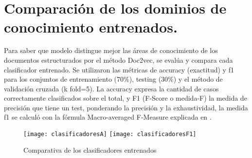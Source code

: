 %
%
%
%


\section{Comparación  de los dominios de conocimiento entrenados.}

Para saber que modelo distingue mejor las áreas de conocimiento de los documentos  estructurados por el método  Doc2vec, se evalúa y compara cada clasificador entrenado.
  Se utilizaron las métricas de accuracy (exactitud) y f1 para los conjuntos de entrenamiento (70\%),   testing (30\%) y el método de validación cruzada (k fold=5). La accuracy expresa la cantidad de casos correctamente clasificados sobre el total, y F1 (F-Score o medida-F) la medida de precisión que tiene un test, ponderando la precisión y la exhaustividad, la medida f1 se calculó con la fórmula Macro-averaged F-Measure explicada  en  \cite{ozgur2005text}.

\begin{figure}[H]
\texttt{[image: clasificadoresA]}
\texttt{[image: clasificadoresF1]}
\caption{Comparativa de los clasificadores entrenados }
\label{fig:clasificadoresA}
\end{figure}


